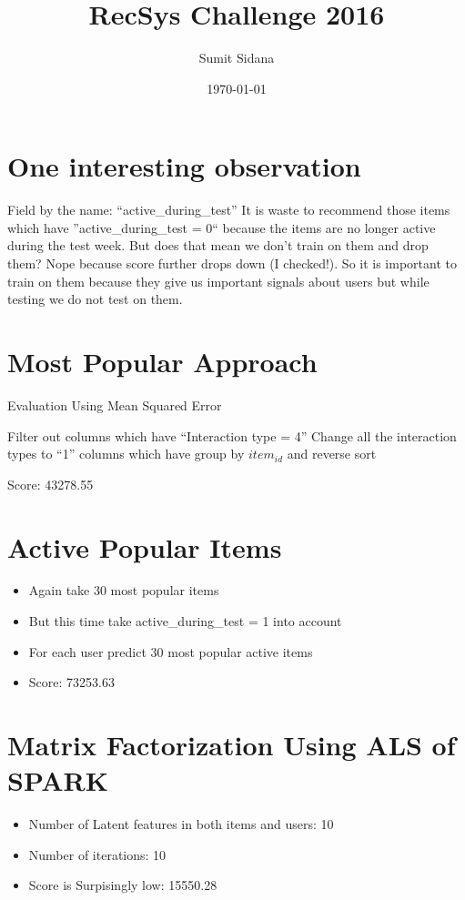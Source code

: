 \documentclass{article}
\begin{document}
\title{RecSys Challenge 2016}
\author{Sumit Sidana}
\date{\today}
\maketitle
\section{One interesting observation}
Field by the name: ``active\_during\_test''
It is waste to recommend those items which have ''active\_during\_test = 0`` because the items are no longer active during the test week. But does that mean we don't train on them and drop 
them? Nope because score further drops down (I checked!). So it is important to train on them because they give us important signals about users but while testing we do not test on them.
\section{Most Popular Approach}

\begin{algorithm}
\caption{Evaluation Using Mean Squared Error}
\begin{algorithmic}[1] 
\State Filter out columns which have ``Interaction type = 4''
\State Change all the interaction types to ``1'' columns which have
\State group by $item_{id}$ and reverse sort
\end{algorithmic}
\end{algorithm}
Score: 43278.55

\section{Active Popular Items}
\begin{itemize}
 \item Again take 30 most popular items
 \item But this time take active\_during\_test = 1 into account
 \item For each user predict 30 most popular active items
 \item Score: 73253.63 	
\end{itemize}

\section{Matrix Factorization Using ALS of SPARK}
\begin{itemize}
 \item Number of Latent features in both items and users: 10
 \item Number of iterations: 10
 \item Score is Surpisingly low:  15550.28
\end{itemize}
\end{document}
